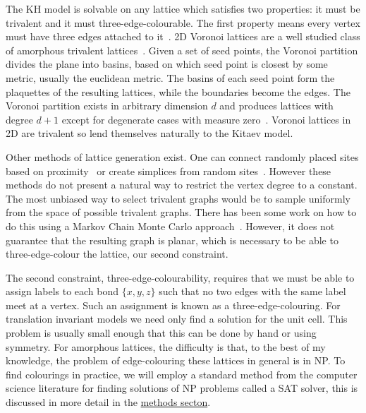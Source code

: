 The KH model is solvable on any lattice which satisfies two properties: it must be trivalent and it must three-edge-colourable. The first property means every vertex must have three edges attached to it~\autocite{kitaevAnyonsExactlySolved2006,Nussinov2009}. 2D Voronoi lattices are a well studied class of amorphous trivalent lattices~\autocite{mitchellAmorphousTopologicalInsulators2018,florescu_designer_2009,marsalTopologicalWeaireThorpeModels2020}. Given a set of seed points, the Voronoi partition divides the plane into basins, based on which seed point is closest by some metric, usually the euclidean metric. The basins of each seed point form the plaquettes of the resulting lattices, while the boundaries become the edges. The Voronoi partition exists in arbitrary dimension \(d\) and produces lattices with degree \(d+1\) except for degenerate cases with measure zero~\autocite{voronoiNouvellesApplicationsParamètres1908,watsonComputingNdimensionalDelaunay1981}. Voronoi lattices in 2D are trivalent so lend themselves naturally to the Kitaev model.

Other methods of lattice generation exist. One can connect randomly placed sites based on proximity~\autocite{agarwala2019topological} or create simplices from random sites~\autocite{christRandomLatticeField1982}. However these methods do not present a natural way to restrict the vertex degree to a constant. The most unbiased way to select trivalent graphs would be to sample uniformly from the space of possible trivalent graphs. There has been some work on how to do this using a Markov Chain Monte Carlo approach~\autocite{alyamiUniformSamplingDirected2016}. However, it does not guarantee that the resulting graph is planar, which is necessary to be able to three-edge-colour the lattice, our second constraint.

The second constraint, three-edge-colourability, requires that we must be able to assign labels to each bond \(\{x,y,z\}\) such that no two edges with the same label meet at a vertex. Such an assignment is known as a three-edge-colouring. For translation invariant models we need only find a solution for the unit cell. This problem is usually small enough that this can be done by hand or using symmetry. For amorphous lattices, the difficulty is that, to the best of my knowledge, the problem of edge-colouring these lattices in general is in NP. To find colourings in practice, we will employ a standard method from the computer science literature for finding solutions of NP problems called a SAT solver, this is discussed in more detail in the \protect\hyperlink{amk-methods}{methods secton}.

